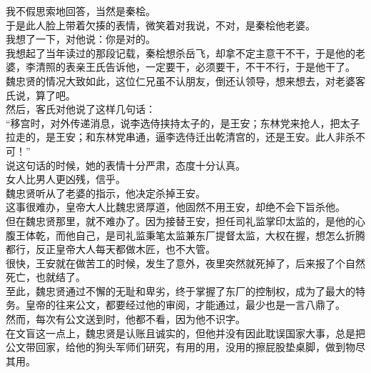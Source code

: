 \begin{multicols}{\theparacolNo}
我不假思索地回答，当然是秦桧。\\

于是此人脸上带着欠揍的表情，微笑着对我说，不对，是秦桧他老婆。\\

我想了一下，对他说：你是对的。\\

我想起了当年读过的那段记载，秦桧想杀岳飞，却拿不定主意干不干，于是他的老婆，李清照的表亲王氏告诉他，一定要干，必须要干，不干不行，于是他干了。\\

魏忠贤的情况大致如此，这位仁兄虽不认朋友，倒还认领导，想来想去，对老婆客氏说，算了吧。\\

然后，客氏对他说了这样几句话：\\

“移宫时，对外传递消息，说李选侍挟持太子的，是王安；东林党来抢人，把太子拉走的，是王安；和东林党串通，逼李选侍迁出乾清宫的，还是王安。此人非杀不可！”\\

说这句话的时候，她的表情十分严肃，态度十分认真。\\

女人比男人更凶残，信乎。\\

魏忠贤听从了老婆的指示，他决定杀掉王安。\\

这事很难办，皇帝大人比魏忠贤厚道，他固然不用王安，却绝不会下旨杀他。\\

但在魏忠贤那里，就不难办了。因为接替王安，担任司礼监掌印太监的，是他的心腹王体乾，而他自己，是司礼监秉笔太监兼东厂提督太监，大权在握，想怎么折腾都行，反正皇帝大人每天都做木匠，也不大管。\\

很快，王安就在做苦工的时候，发生了意外，夜里突然就死掉了，后来报了个自然死亡，也就结了。\\

至此，魏忠贤通过不懈的无耻和卑劣，终于掌握了东厂的控制权，成为了最大的特务。皇帝的往来公文，都要经过他的审阅，才能通过，最少也是一言八鼎了。\\

然而，每次有公文送到时，他都不看，因为他不识字。\\

在文盲这一点上，魏忠贤是认账且诚实的，但他并没有因此耽误国家大事，总是把公文带回家，给他的狗头军师们研究，有用的用，没用的擦屁股垫桌脚，做到物尽其用。\\

\ifnum{}
	\end{multicols}
\fi
\newpage
